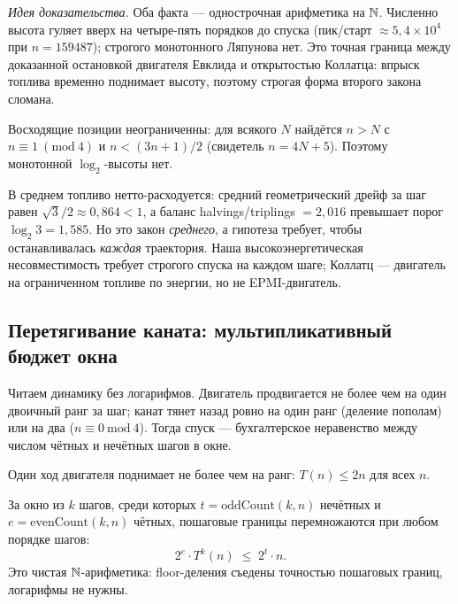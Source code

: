 \emph{Идея доказательства.} Оба факта --- однострочная арифметика на $\mathbb{N}$. Численно высота гуляет вверх
на четыре-пять порядков до спуска (пик/старт $\approx 5{,}4\times 10^{4}$ при $n=159487$); строгого
монотонного Ляпунова нет. Это точная граница между доказанной остановкой двигателя Евклида и
открытостью Коллатца: впрыск топлива временно поднимает высоту, поэтому строгая форма второго закона
сломана.

\begin{theorem}\label{thm:no_monotone_height}
Восходящие позиции неограниченны: для всякого $N$ найдётся $n>N$ с $n\equiv 1\ (\mathrm{mod}\ 4)$ и
$n<(3n+1)/2$ (свидетель $n=4N+5$). Поэтому монотонной $\log_2$-высоты нет. \green{}
\end{theorem}

В среднем топливо нетто-расходуется: средний геометрический дрейф за шаг равен $\sqrt{3}/2\approx
0{,}864<1$, а баланс halvings/triplings $=2{,}016$ превышает порог $\log_2 3=1{,}585$. Но это закон
\emph{среднего}, а гипотеза требует, чтобы останавливалась \emph{каждая} траектория. Наша
высокоэнергетическая несовместимость требует строгого спуска на каждом шаге; Коллатц --- двигатель на
ограниченном топливе по энергии, но не EPMI-двигатель.

\subsection{Перетягивание каната: мультипликативный бюджет окна}

Читаем динамику без логарифмов. Двигатель продвигается не более чем на один двоичный ранг за шаг;
канат тянет назад ровно на один ранг (деление пополам) или на два ($n\equiv 0\ \mathrm{mod}\ 4$). Тогда
спуск --- бухгалтерское неравенство между числом чётных и нечётных шагов в окне.

\begin{theorem}\label{thm:engine_at_most_one_rank}
Один ход двигателя поднимает не более чем на ранг: $T(n)\le 2n$ для всех $n$. \green{}
\end{theorem}

\begin{theorem}\label{thm:window_budget}
За окно из $k$ шагов, среди которых $t=\mathrm{oddCount}(k,n)$ нечётных и
$e=\mathrm{evenCount}(k,n)$ чётных, пошаговые границы перемножаются при любом порядке шагов:
\begin{equation}\label{eq:window-budget}
2^{e}\cdot T^{k}(n)\;\le\;2^{t}\cdot n.
\end{equation}
Это чистая $\mathbb{N}$-арифметика: floor-деления съедены точностью пошаговых границ, логарифмы не нужны. \green{}
\end{theorem}

